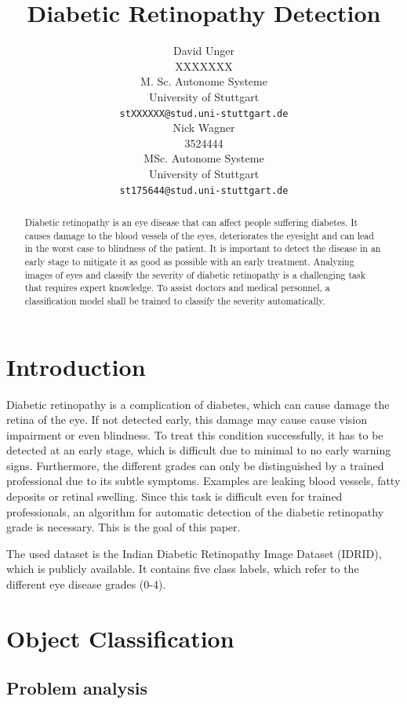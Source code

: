 \documentclass{article}
\title{Diabetic Retinopathy Detection}
\author{
  David Unger\\
  XXXXXXX \\
  M. Sc. Autonome Systeme\\
  University of Stuttgart\\
  \texttt{stXXXXXX@stud.uni-stuttgart.de} \\
  \And
  Nick Wagner\\
  3524444 \\
  MSc. Autonome Systeme\\
  University of Stuttgart\\
  \texttt{st175644@stud.uni-stuttgart.de} \\
}
\begin{document}
\maketitle

\begin{abstract}
Diabetic retinopathy is an eye disease that can affect people suffering diabetes. It causes damage to the blood vessels of 
the eyes, deteriorates the eyesight and can lead in the worst case to blindness of the patient. It is important to 
detect the disease in an early stage to mitigate it as good as possible with an early treatment. Analyzing images of 
eyes and classify the severity of diabetic retinopathy is a challenging task that requires expert knowledge. To assist 
doctors and medical personnel, a classification model shall be trained to classify the severity automatically. 
\end{abstract}

\section{Introduction}
Diabetic retinopathy is a complication of diabetes, which can cause damage the retina of the eye. 
If not detected early, this damage may cause cause vision impairment or even blindness. 
To treat this condition successfully, it has to be detected at an early stage, which is difficult due to minimal to no early warning signs. 
Furthermore, the different grades can only be distinguished by a trained professional due to its subtle symptoms.
Examples are leaking blood vessels, fatty deposits or retinal swelling.
Since this task is difficult even for trained professionals, an algorithm for automatic detection of the diabetic retinopathy grade is necessary.
This is the goal of this paper. 

The used dataset is the Indian Diabetic Retinopathy Image Dataset (IDRID), which is publicly available. It contains five class labels, which refer to 
the different eye disease grades (0-4).

\section{Object Classification}
\subsection{Problem analysis}
\end{document}
